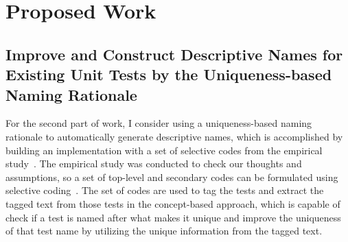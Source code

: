\section{Proposed Work}
 

\subsection{Improve and Construct Descriptive Names for Existing Unit Tests by the Uniqueness-based Naming Rationale}
\label{sec:unique-test-name}

For the second part of work, I consider using a uniqueness-based naming rationale to automatically generate descriptive names, which is accomplished by building an implementation with a set of selective codes from the empirical study~\cite{emp-study}.
%
The empirical study was conducted to check our thoughts and assumptions, so a set of top-level and secondary codes can be formulated using selective coding~\cite{glaser1967discovery,strauss1998basics}.
%
The set of codes are used to tag the tests and extract the tagged text from those tests in the concept-based approach, which is capable of check if a test is named after what makes it unique and improve the uniqueness of that test name by utilizing the unique information from the tagged text.